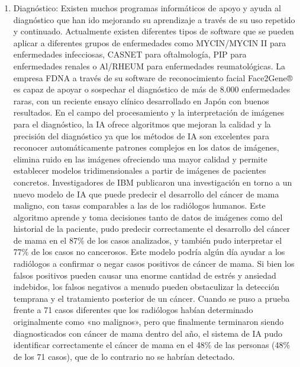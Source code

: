 \documentclass[10pt]{article}
\begin{document}
\begin{enumerate}
    \item Diagnóstico: Existen muchos programas informáticos de apoyo y ayuda al diagnóstico que han ido mejorando su aprendizaje a través de su uso repetido y continuado. Actualmente existen diferentes tipos de software que se pueden aplicar a diferentes grupos de enfermedades como MYCIN/MYCIN II para enfermedades infecciosas, CASNET para oftalmología, PIP para enfermedades renales o Al/RHEUM para enfermedades reumatológicas. La empresa FDNA a través de su software de reconocimiento facial Face2Gene® es capaz de apoyar o sospechar el diagnóstico de más de 8.000 enfermedades raras, con un reciente ensayo clínico desarrollado en Japón con buenos resultados. En el campo del procesamiento y la interpretación de imágenes para el diagnóstico, la IA ofrece algoritmos que mejoran la calidad y la precisión del diagnóstico ya que los métodos de IA son excelentes para reconocer automáticamente patrones complejos en los datos de imágenes, elimina ruido en las imágenes ofreciendo una mayor calidad y permite establecer modelos tridimensionales a partir de imágenes de pacientes concretos. Investigadores de IBM publicaron una investigación en torno a un nuevo modelo de IA que puede predecir el desarrollo del cáncer de mama maligno, con tasas comparables a las de los radiólogos humanos. Este algoritmo aprende y toma decisiones tanto de datos de imágenes como del historial de la paciente, pudo predecir correctamente el desarrollo del cáncer de mama en el 87\% de los casos analizados, y también pudo interpretar el 77\% de los casos no cancerosos. Este modelo podría algún día ayudar a los radiólogos a confirmar o negar casos positivos de cáncer de mama. Si bien los falsos positivos pueden causar una enorme cantidad de estrés y ansiedad indebidos, los falsos negativos a menudo pueden obstaculizar la detección temprana y el tratamiento posterior de un cáncer. Cuando se puso a prueba frente a 71 casos diferentes que los radiólogos habían determinado originalmente como «no malignos», pero que finalmente terminaron siendo diagnosticados con cáncer de mama dentro del año, el sistema de IA pudo identificar correctamente el cáncer de mama en el 48\% de las personas (48\% de los 71 casos), que de lo contrario no se habrían detectado.

\end{enumerate}
\end{document}
